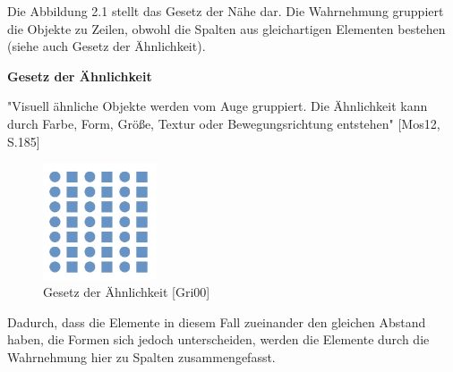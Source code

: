 Die Abbildung 2.1 stellt das Gesetz der Nähe dar. Die Wahrnehmung gruppiert die Objekte zu Zeilen, obwohl die Spalten aus gleichartigen Elementen bestehen (siehe auch Gesetz der Ähnlichkeit).

\textbf{Gesetz der Ähnlichkeit}

"Visuell ähnliche Objekte werden vom Auge gruppiert. Die Ähnlichkeit kann durch Farbe, Form, Größe, Textur oder Bewegungsrichtung entstehen" [Mos12, S.185]


\begin{figure}[H]
 \centering
 \includegraphics[width=0.2999\textwidth]{grafiken/Gesetz_Aehnl.jpg}
 \caption{Gesetz der Ähnlichkeit [Gri00]}
 \label{fig:gesetz2}
\end{figure} 

Dadurch, dass die Elemente in diesem Fall zueinander den gleichen Abstand haben, die Formen sich jedoch unterscheiden, werden die Elemente durch die Wahrnehmung hier zu Spalten zusammengefasst.
